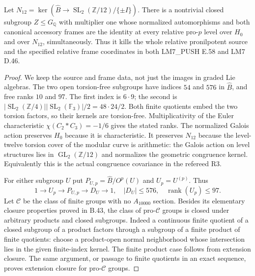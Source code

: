 Let $N_{12}=\ker(\widehat B\to
\operatorname{SL}_2(\mathbb Z/12)/\{\pm I\})$.
There is a nontrivial closed subgroup
$Z\leq G_{\mathbb Q}$ with multiplier
one whose normalized automorphisms
and both canonical accessory frames
are the identity at every relative
pro-$p$ level over $H_0$ and over
$N_{12}$, simultaneously.  Thus it
kills the whole relative pronilpotent
source and the specified relative
frame coordinates in both LM7\_PUSH
E.58 and LM7 D.46.

\begin{proof}
We keep the source and frame data,
not just the images in graded Lie
algebras.  The two open torsion-free
subgroups have indices $54$ and
$576$ in $\widehat B$, and free
ranks $10$ and $97$.  The first
index is $6\cdot9$; the second is
$|\operatorname{SL}_2(\mathbb Z/4)|
 |\operatorname{SL}_2(\mathbb F_3)|/2
=48\cdot24/2$.  Both finite
quotients embed the two torsion
factors, so their kernels are
torsion-free.  Multiplicativity
of the Euler characteristic
$\chi(C_2*C_3)=-1/6$ gives the
stated ranks.  The normalized
Galois action preserves $H_0$
because it is characteristic.
It preserves $N_{12}$ because
the level-twelve torsion cover
of the modular curve is arithmetic:
the Galois action on level structures
lies in $\operatorname{GL}_2(\mathbb Z/12)$
and normalizes the geometric
congruence kernel.  Equivalently
this is the actual congruence
covariance in the refereed R3.

For either subgroup $U$ put
$P_{U,p}=\widehat B/O^p(U)$ and
$U_p=U^{(p)}$.  Thus
\[
 1\longrightarrow U_p\longrightarrow
 P_{U,p}\longrightarrow D_U
 \longrightarrow1,
 \quad |D_U|\leq576,
 \quad \operatorname{rank}(U_p)\leq97.                       \tag{B.44.1}
\]
Let $\mathscr C$ be the class of
finite groups with no $A_{10000}$
section.  Besides its elementary
closure properties proved in B.43,
the class of pro-$\mathscr C$
groups is closed under arbitrary
products and closed subgroups.
Indeed a continuous finite quotient
of a closed subgroup of a product
factors through a subgroup of a
finite product of finite quotients:
choose a product-open normal
neighborhood whose intersection
lies in the given finite-index
kernel.  The finite product case
follows from extension closure.
The same argument, or passage
to finite quotients in an exact
sequence, proves extension closure
for pro-$\mathscr C$ groups.


\end{proof}
